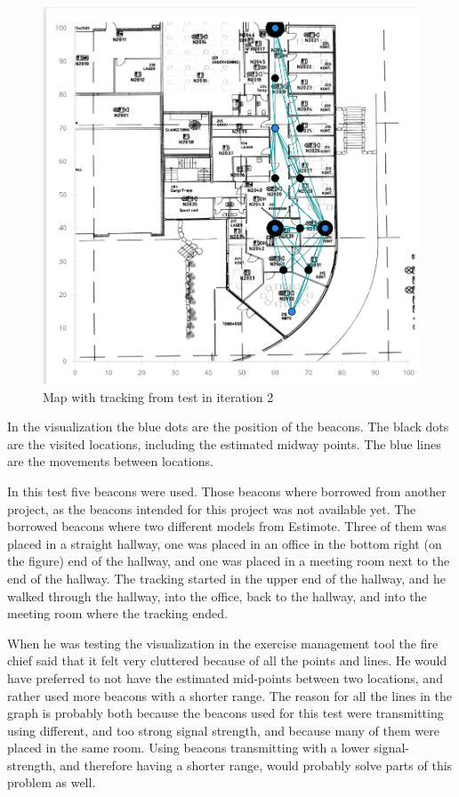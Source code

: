 \documentclass[../Main/thesis.tex]{subfiles}
\begin{document}
\begin{figure}[h]
	\centering
	\includegraphics[width=\textwidth]{../fig/iteration2-map}
	\caption{Map with tracking from test in iteration 2}
	\label{fig:iteration2-map}
\end{figure}

In the visualization the blue dots are the position of the beacons.
The black dots are the visited locations, including the estimated midway points.
The blue lines are the movements between locations.

In this test five beacons were used. 
Those beacons where borrowed from another project, as the beacons intended for this project was not available yet.
The borrowed beacons where two different models from Estimote.
Three of them was placed in a straight hallway, one was placed in an office in the bottom right (on the figure) end of the hallway, and one was placed in a meeting room next to the end of the hallway.
The tracking started in the upper end of the hallway, and he walked through the hallway, into the office, back to the hallway, and into the meeting room where the tracking ended.

When he was testing the visualization in the exercise management tool the fire chief said that it felt very cluttered because of all the points and lines.
He would have preferred to not have the estimated mid-points between two locations, and rather used more beacons with a shorter range.
The reason for all the lines in the graph is probably both because the beacons used for this test were transmitting using different, and too strong signal strength, and because many of them were placed in the same room.
Using beacons transmitting with a lower signal-strength, and therefore having a shorter range, would probably solve parts of this problem as well.
\end{document}
